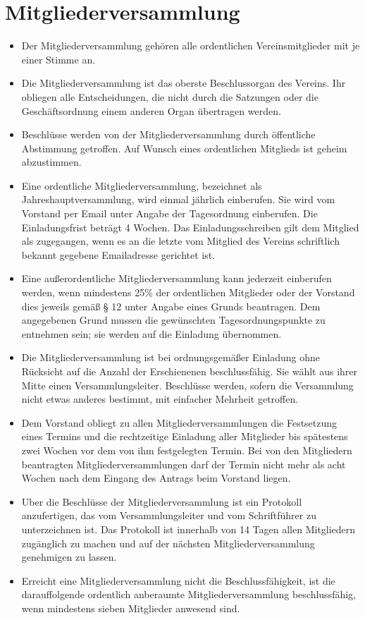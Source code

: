 \documentclass[a4paper,10pt]{article}
\begin{document}
\section{Mitgliederversammlung}
  \begin{itemize}
   \item Der Mitgliederversammlung gehören alle ordentlichen Vereinsmitglieder mit je einer Stimme an. 
   \item Die Mitgliederversammlung ist das oberste Beschlussorgan des Vereins. Ihr obliegen alle Entscheidungen, die nicht durch die Satzungen oder die Geschäftsordnung einem anderen Organ übertragen werden.
   \item Beschlüsse werden von der Mitgliederversammlung durch öffentliche Abstimmung getroffen. Auf Wunsch eines ordentlichen Mitglieds ist geheim abzustimmen.
   \item Eine ordentliche Mitgliederversammlung, bezeichnet als Jahreshauptversammlung, wird einmal jährlich einberufen. Sie wird vom Vorstand per Email unter Angabe der Tagesordnung einberufen. Die Einladungsfrist beträgt 4 Wochen. Das Einladungsschreiben gilt dem Mitglied als zugegangen, wenn es an die letzte vom Mitglied des Vereins schriftlich bekannt gegebene Emailadresse gerichtet ist. 
   \item Eine außerordentliche Mitgliederversammlung kann jederzeit einberufen werden, wenn mindestens 25\% der ordentlichen Mitglieder oder der Vorstand dies jeweils gemäß § 12 unter Angabe eines Grunds beantragen. Dem angegebenen Grund mussen die gewünschten Tagesordnungspunkte zu entnehmen sein; sie werden auf die Einladung übernommen.
   \item Die Mitgliederversammlung ist bei ordnungsgemäßer Einladung ohne Rücksicht auf die Anzahl der Erschienenen beschlussfähig. Sie wählt aus ihrer Mitte einen Versammlungsleiter. Beschlüsse werden, sofern die Versammlung nicht etwas anderes bestimmt, mit einfacher Mehrheit getroffen. 
   \item Dem Vorstand obliegt zu allen Mitgliederversammlungen die Festsetzung eines Termins und die rechtzeitige Einladung aller Mitglieder bis spätestens zwei Wochen vor dem von ihm festgelegten Termin. Bei von den Mitgliedern beantragten Mitgliederversammlungen darf der Termin nicht mehr als acht Wochen nach dem Eingang des Antrags beim Vorstand liegen.
   \item Uber die Beschlüsse der Mitgliederversammlung ist ein Protokoll anzufertigen, das vom Versammlungsleiter und vom Schriftführer zu unterzeichnen ist. Das Protokoll ist innerhalb von 14 Tagen allen Mitgliedern zugänglich zu machen und auf der nächsten Mitgliederversammlung genehmigen zu lassen.
   \item Erreicht eine Mitgliederversammlung nicht die Beschlussfähigkeit, ist die darauffolgende ordentlich anberaumte Mitgliederversammlung beschlussfähig, wenn mindestens sieben Mitglieder anwesend sind.
  \end{itemize}
  
\end{document}
